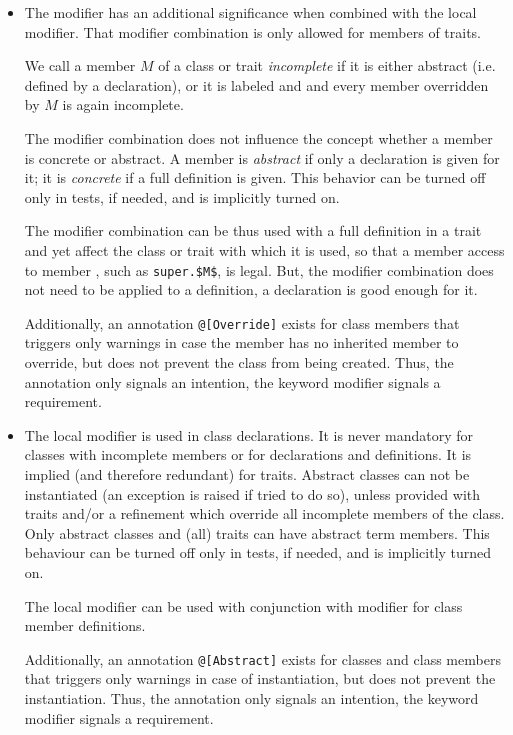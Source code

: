 \begin{itemize}
  \item The  modifier has an additional significance when combined with the  local modifier. That modifier combination is only allowed for members of traits. 

  We call a member $M$ of a class or trait {\em incomplete} if it is either abstract (i.e. defined by a declaration), or it is labeled  and  and every member overridden by $M$ is again incomplete. 

  The  modifier combination does not influence the concept whether a member is concrete or abstract. A member is {\em abstract} if only a declaration is given for it; it is {\em concrete} if a full definition is given. This behavior can be turned off only in tests, if needed, and is implicitly turned on. 

  The  modifier combination can be thus used with a full definition in a trait and yet affect the class or trait with which it is used, so that a member access to member , such as \lstinline!super.$M$!, is legal. But, the  modifier combination does not need to be applied to a definition, a declaration is good enough for it. 

  Additionally, an annotation \lstinline!@[Override]! exists for class members that triggers only warnings in case the member has no inherited member to override, but does not prevent the class from being created. Thus, the annotation only signals an intention, the keyword modifier signals a requirement. 

  \item The  local modifier is used in class declarations. It is never mandatory for classes with incomplete members or for declarations and definitions. It is implied (and therefore redundant) for traits. Abstract classes can not be instantiated (an exception is raised if tried to do so), unless provided with traits and/or a refinement which override all incomplete members of the class. Only abstract classes and (all) traits can have abstract term members. This behaviour can be turned off only in tests, if needed, and is implicitly turned on. 

  The  local modifier can be used with conjunction with  modifier for class member definitions. 

  Additionally, an annotation \lstinline!@[Abstract]! exists for classes and class members that triggers only warnings in case of instantiation, but does not prevent the instantiation. Thus, the annotation only signals an intention, the keyword modifier signals a requirement. 


\end{itemize}
